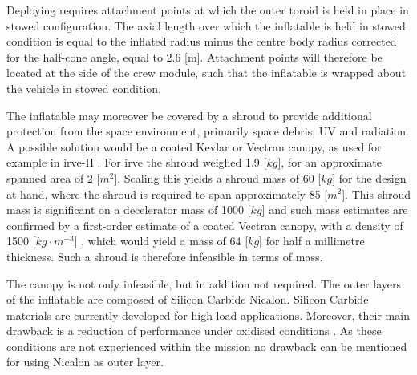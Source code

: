 Deploying requires attachment points at which the outer toroid is held in place in stowed configuration. The axial length over which the inflatable is held in stowed condition is equal to the inflated radius minus the centre body radius corrected for the half-cone angle, equal to 2.6 [m]. Attachment points will therefore be located at the side of the crew module, such that the inflatable is wrapped about the vehicle in stowed condition. 

The inflatable may moreover be covered by a shroud to provide additional protection from the space environment, primarily space debris, UV and radiation. A possible solution would be a coated Kevlar or Vectran canopy, as used for example in \gls{irve}-II \cite{Dillman2010}. For \gls{irve} the shroud weighed 1.9 [$kg$], for an approximate spanned area of 2 [$m^{2}$]. Scaling this yields a shroud mass of 60 [$kg$] for the design at hand, where the shroud is required to span approximately 85 [$m^{2}$]. This shroud mass is significant on a decelerator mass of 1000 [$kg$] and such mass estimates are confirmed by a first-order estimate of a coated Vectran canopy, with a density of 1500 [$kg\cdot m^{-3}$] \cite{Miller2014}, which would yield a mass of 64 [$kg$] for half a millimetre thickness. Such a shroud is therefore infeasible in terms of mass.

The canopy is not only infeasible, but in addition not required. The outer layers of the inflatable are composed of Silicon Carbide Nicalon. Silicon Carbide materials are currently developed for high load applications. Moreover, their main drawback is a reduction of performance under oxidised conditions \cite{Dutta2001}. As these conditions are not experienced within the mission no drawback can be mentioned for using Nicalon as outer layer.




